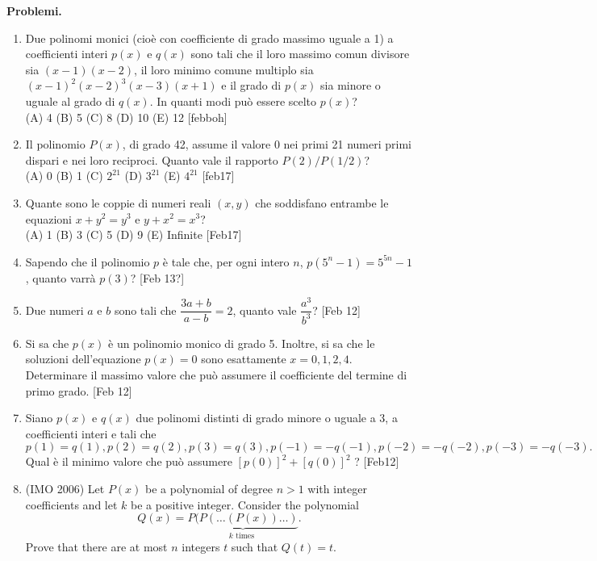 \documentclass[a4paper]{article}
\theoremstyle{remark}
\theoremstyle{definition}
\begin{document}
\textbf{Problemi.}

\begin{enumerate}
	\item Due polinomi monici (cioè con coefficiente di grado massimo uguale a 1) a coefficienti interi $ p(x) $ e $ q(x) $ sono tali che il loro massimo comun divisore sia $ (x - 1)(x - 2) $, il loro minimo comune multiplo sia $ (x-1)^2 (x-2)^3(x-3)(x+ 1)$ e il grado di $ p(x) $ sia minore o uguale al grado di $ q(x) $. In quanti modi può essere scelto $ p(x) $?\\
	(A) 4 (B) 5 (C) 8 (D) 10 (E) 12 [febboh]
	
	\item Il polinomio $ P(x) $, di grado 42, assume il valore 0 nei primi 21 numeri primi dispari e nei loro reciproci. Quanto vale il rapporto $ P(2)/P(1/2) $?\\
	(A) 0 (B) 1 (C) $ 2^{21} $ (D) $ 3^{21} $ (E) $ 4^{21} $ [feb17]
	
	\item Quante sono le coppie di numeri reali $ (x,y) $ che soddisfano entrambe le equazioni $ x + y^2 = y^3 $ e $ y + x^2 = x^3 $?\\
	(A) 1 (B) 3 (C) 5 (D) 9 (E) Infinite [Feb17]
	
	\item Sapendo che il polinomio $ p $ è tale che, per ogni intero $ n $, $ p(5^n - 1) = 5^{5n} - 1 $, quanto varrà $ p(3) $? [Feb 13?]
	
	\item Due numeri $ a $ e $ b $ sono tali che $ \dfrac{3a+b}{a-b} = 2 $, quanto vale $ \dfrac{a^3}{b^3} $? [Feb 12]
	
	\item Si sa che $ p(x) $ è un polinomio monico di grado 5. Inoltre, si sa che le soluzioni dell’equazione $ p(x) = 0 $ sono esattamente $ x = 0, 1, 2, 4 $. Determinare il massimo valore che può assumere il coefficiente del termine di primo grado. [Feb 12]
	
	\item Siano $ p(x) $ e $ q(x) $ due polinomi distinti di grado minore o uguale a 3, a coefficienti interi e tali che$$  
	p(1) = q(1), p(2) = q(2), p(3) = q(3),
	p(-1) = -q(-1), p(-2) = -q(-2), p(-3) = -q(-3).
	 $$	Qual è il minimo valore che può assumere $ [p(0)]^2 + [q(0)]^2 $ ? [Feb12]
	 
	 \item  (IMO 2006) Let $ P(x) $ be a polynomial of degree $ n > 1 $ with integer coefficients and let $ k $ be a positive integer. Consider the polynomial
	 $$  Q(x) = \underbrace{P(P(\dots (P(x))\dots)}_{k \text{ times }}.  $$
	 Prove that there are at most $ n $ integers $ t $ such that $ Q(t) = t $.
	 

\end{enumerate}
\end{document}
